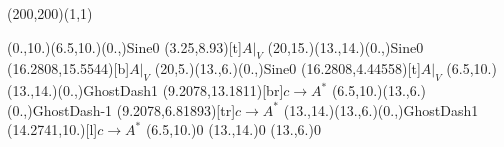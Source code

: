 \unitlength=1bp%

\begin{feynartspicture}(200,200)(1,1)

\FADiagram{}
\FAProp(0.,10.)(6.5,10.)(0.,){Sine}{0}
\FALabel(3.25,8.93)[t]{$A|_V$}
\FAProp(20,15.)(13.,14.)(0.,){Sine}{0}
\FALabel(16.2808,15.5544)[b]{$A|_V$}
\FAProp(20,5.)(13.,6.)(0.,){Sine}{0}
\FALabel(16.2808,4.44558)[t]{$A|_V$}
\FAProp(6.5,10.)(13.,14.)(0.,){GhostDash}{1}
\FALabel(9.2078,13.1811)[br]{$c\to A^*$}
\FAProp(6.5,10.)(13.,6.)(0.,){GhostDash}{-1}
\FALabel(9.2078,6.81893)[tr]{$c\to A^*$}
\FAProp(13.,14.)(13.,6.)(0.,){GhostDash}{1}
\FALabel(14.2741,10.)[l]{$c\to A^*$}
\FAVert(6.5,10.){0}
\FAVert(13.,14.){0}
\FAVert(13.,6.){0}
\end{feynartspicture}

